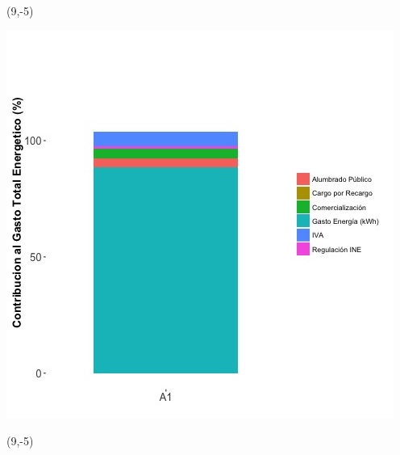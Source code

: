 \documentclass{article}\usepackage[]{graphicx}\usepackage[]{color}
\newenvironment{knitrout}{}{} %
\begin{document}
 \begin{textblock}{1}(9,-5)
\begin{minipage}{20em}
\begingroup

\endgroup
\end{minipage}
\end{textblock}

\begin{knitrout}
\color{fgcolor}
\includegraphics[scale=0.65]{figure/A1_costvars_plot.jpg} 
\end{knitrout}

 \begin{textblock}{1}(9,-5)
\begin{minipage}{20em}
\begingroup

\endgroup
\end{minipage}
\end{textblock}
\end{document}
